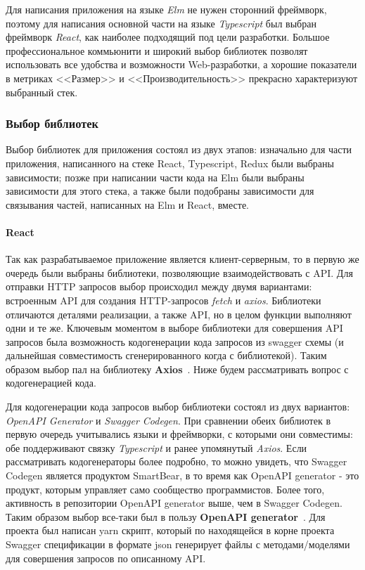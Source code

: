 \documentclass[a4paper,12pt,reqno]{article}
\begin{document}
Для написания приложения на языке \textit{Elm} не нужен сторонний фреймворк, поэтому для написания основной части на языке \textit{Typescript} был выбран фреймворк \textit{React}, как наиболее подходящий под цели разработки. Большое профессиональное коммьюнити и широкий выбор библиотек позволят использовать все удобства и возможности Web-разработки, а хорошие показатели в метриках <<Размер>> и <<Производительность>> прекрасно характеризуют выбранный стек.

\subsubsection{Выбор библиотек} \label{sec: libr}

Выбор библиотек для приложения состоял из двух этапов: изначально для части приложения, написанного на стеке React, Typescript, Redux были выбраны зависимости; позже при написании части кода на Elm были выбраны зависимости для этого стека, а также были подобраны зависимости для связывания частей, написанных на Elm и React, вместе.

\paragraph*{React\\}

Так как разрабатываемое приложение является клиент-серверным, то в первую же очередь были выбраны библиотеки, позволяющие взаимодействовать с API. Для отправки HTTP запросов выбор происходил между двумя вариантами: встроенным API для создания HTTP-запросов \textit{fetch} и \textit{axios}. Библиотеки отличаются деталями реализации, а также API, но в целом функции выполняют одни и те же. Ключевым моментом в выборе библиотеки для совершения API запросов была возможность кодогенерации кода запросов из swagger схемы (и дальнейшая совместимость сгенерированного когда с библиотекой). Таким образом выбор пал на библиотеку \textbf{Axios}~\cite{axios}. Ниже будем рассматривать вопрос с кодогенерацией кода.

Для кодогенерации кода запросов выбор библиотеки состоял из двух вариантов: \textit{OpenAPI Generator} и \textit{Swagger Codegen}. При сравнении обеих библиотек в первую очередь учитывались языки и фреймворки, с которыми они совместимы: обе поддерживают связку \textit{Typescript} и ранее упомянутый \textit{Axios}. Если рассматривать кодогенераторы более подробно, то можно увидеть, что Swagger Codegen является продуктом SmartBear, в то время как OpenAPI generator - это продукт, которым управляет само сообщество программистов. Более того, активность в репозитории OpenAPI generator
выше, чем в Swagger Codegen. Таким образом выбор все-таки был в пользу \textbf{OpenAPI generator}~\cite{openapi}. Для проекта был написан yarn скрипт, который по находящейся в корне проекта Swagger спецификации в формате json генерирует файлы с методами/моделями для совершения запросов по описанному API.
\end{document}

